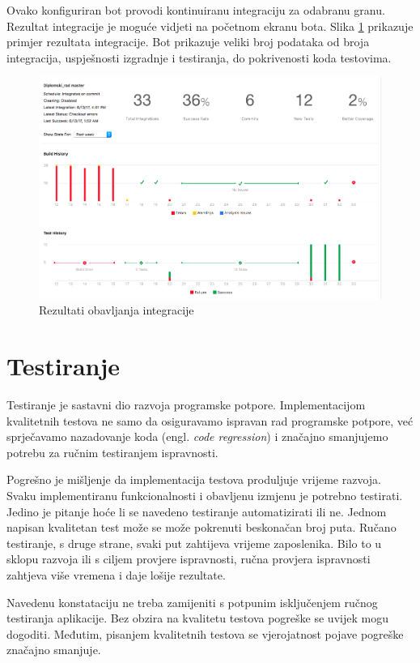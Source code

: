 \documentclass[times, utf8, diplomski, numeric]{fer}
\newcommand{\eng}[1]{(engl. \textit{#1})}
\begin{document}
Ovako konfiguriran bot provodi kontinuiranu integraciju za odabranu granu. Rezultat integracije je moguće vidjeti na početnom ekranu bota. Slika \ref{fig:XcodeServerResult} prikazuje primjer rezultata integracije. Bot prikazuje veliki broj podataka od broja integracija, uspješnosti izgradnje i testiranja, do pokrivenosti koda testovima.
    
\begin{figure}
\centering
\includegraphics[scale=0.4]{XcodeServerResult}
\caption{Rezultati obavljanja integracije}
\label{fig:XcodeServerResult}
\end{figure}

\section{Testiranje}

Testiranje je sastavni dio razvoja programske potpore. Implementacijom kvalitetnih testova ne samo da osiguravamo ispravan rad programske potpore, već sprječavamo nazadovanje koda \eng{code regression} i značajno smanjujemo potrebu za ručnim testiranjem ispravnosti\citep{wiki:SoftwareTesting}.

Pogrešno je mišljenje da implementacija testova produljuje vrijeme razvoja. Svaku implementiranu funkcionalnosti i obavljenu izmjenu je potrebno testirati. Jedino je pitanje hoće li se navedeno testiranje automatizirati ili ne. Jednom napisan kvalitetan test može se može pokrenuti beskonačan broj puta. Ručano testiranje, s druge strane, svaki put zahtijeva vrijeme zaposlenika. Bilo to u sklopu razvoja ili s ciljem provjere ispravnosti, ručna provjera ispravnosti zahtjeva više vremena i daje lošije rezultate.

Navedenu konstataciju ne treba zamijeniti s potpunim isključenjem ručnog testiranja aplikacije. Bez obzira na kvalitetu testova pogreške se uvijek mogu dogoditi. Međutim, pisanjem kvalitetnih testova se vjerojatnost pojave pogreške značajno smanjuje.
\end{document}
